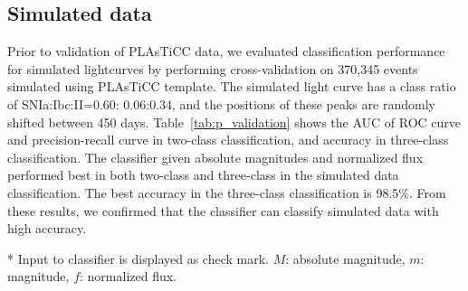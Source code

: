 \documentclass[useamsfonts]{pasj01}
\begin{document}
\subsection{Simulated data}
%
Prior to validation of PLAsTiCC data, we evaluated classification performance for simulated lightcurves by performing cross-validation on 370,345 events simulated using PLAsTiCC template.
The simulated light curve has a class ratio of SNIa:Ibc:II=0.60: 0.06:0.34, and the positions of these peaks are randomly shifted between 450 days.
Table\ \ref{tab:p_validation} shows the AUC of ROC curve and precision-recall curve in two-class classification, and accuracy in three-class classification.
The classifier given absolute magnitudes and normalized flux performed best in both two-class and three-class in the simulated data classification.
The best accuracy in the three-class classification is 98.5\%.
From these results, we confirmed that the classifier can classify simulated data with high accuracy.
%
%
%
%
\begin{table}[ht]
\label{tab:p_validation}
\begin{tabnote}
* Input to classifier is displayed as check mark. $M$: absolute magnitude, $m$: magnitude, $f$: normalized flux.
\end{tabnote}
\end{table}
%
%
\end{document}
